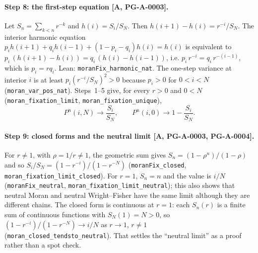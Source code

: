 \documentclass[11pt]{article}
\theoremstyle{remark}
\newcommand{\tier}[1]{\textsf{[#1]}}
\newcommand{\lean}[1]{\texttt{#1}}
\newcommand{\Pn}{P^{n}}
\begin{document}
\paragraph{Step 8: the first-step equation \tier{A, PG-A-0003}.} Let $S_n=\sum_{k<n}r^{-k}$ and $h(i)=S_i/S_N$. Then
$h(i+1)-h(i)=r^{-i}/S_N$. The interior harmonic equation $p_ih(i+1)+q_ih(i-1)+(1-p_i-q_i)h(i)=h(i)$ is equivalent to
$p_i\,(h(i+1)-h(i))=q_i\,(h(i)-h(i-1))$, i.e. $p_i\,r^{-i}=q_i\,r^{-(i-1)}$, which is $p_i=rq_i$. Lean:
\lean{moranFix\_harmonic\_nat}. The one-step variance at interior $i$ is at least $p_i(r^{-i}/S_N)^2>0$ because
$p_i>0$ for $0<i<N$ (\lean{moran\_var\_pos\_nat}). Steps~1--5 give, for every $r>0$ and $0<N$
(\lean{moran\_fixation\_limit}, \lean{moran\_fixation\_unique}),
\[
\Pn(i,N)\longrightarrow\frac{S_i}{S_N},\qquad \Pn(i,0)\longrightarrow1-\frac{S_i}{S_N}.
\]

\paragraph{Step 9: closed forms and the neutral limit \tier{A, PG-A-0003, PG-A-0004}.} For $r\ne1$, with $\rho=1/r\ne1$,
the geometric sum gives $S_n=(1-\rho^n)/(1-\rho)$ and so $S_i/S_N=(1-r^{-i})/(1-r^{-N})$
(\lean{moranFix\_closed}, \lean{moran\_fixation\_limit\_closed}). For $r=1$, $S_n=n$ and the value is $i/N$
(\lean{moranFix\_neutral}, \lean{moran\_fixation\_limit\_neutral}); this also shows that neutral Moran and neutral
Wright--Fisher have the same limit although they are different chains. The closed form is continuous at $r=1$: each
$S_n(r)$ is a finite sum of continuous functions with $S_N(1)=N>0$, so
$(1-r^{-i})/(1-r^{-N})\to i/N$ as $r\to1$, $r\neq1$ (\lean{moran\_closed\_tendsto\_neutral}). That settles the
``neutral limit'' as a proof rather than a spot check.



\end{document}
